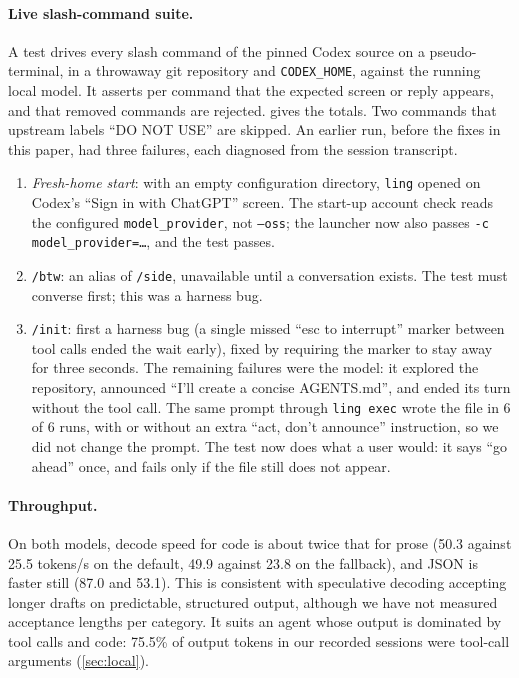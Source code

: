 \documentclass[11pt]{article}
\newcommand{\code}[1]{\texttt{#1}}
\begin{document}
\paragraph{Live slash-command suite.} A test drives every slash command of the pinned Codex source
on a pseudo-terminal, in a throwaway git repository and \code{CODEX\_HOME}, against the running
local model. It asserts per command that the expected screen or reply appears, and that removed
commands are rejected.  gives the totals. Two commands that upstream labels ``DO NOT
USE'' are skipped. An earlier run, before the fixes in this paper, had three failures, each
diagnosed from the session transcript.
\begin{enumerate}
  \item \emph{Fresh-home start}: with an empty configuration directory, \code{ling} opened on
    Codex's ``Sign in with ChatGPT'' screen. The start-up account check reads the configured
    \code{model\_provider}, not \code{--oss}; the launcher now also passes
    \code{-c model\_provider=\ldots}, and the test passes.
  \item \code{/btw}: an alias of \code{/side}, unavailable until a conversation exists. The test
    must converse first; this was a harness bug.
  \item \code{/init}: first a harness bug (a single missed ``esc to interrupt'' marker between tool
    calls ended the wait early), fixed by requiring the marker to stay away for three seconds. The
    remaining failures were the model: it explored the repository, announced ``I'll create a
    concise AGENTS.md'', and ended its turn without the tool call. The same prompt through
    \code{ling exec} wrote the file in 6 of 6 runs, with or without an extra
    ``act, don't announce'' instruction, so we did not change the prompt. The test now does what a
    user would: it says ``go ahead'' once, and fails only if the file still does not appear.
\end{enumerate}

\paragraph{Throughput.} On both models, decode speed for code is about twice that for prose (50.3
against 25.5 tokens/s on the default, 49.9 against 23.8 on the fallback), and JSON is faster still
(87.0 and 53.1). This is consistent with speculative decoding accepting longer drafts on
predictable, structured output, although we have not measured acceptance lengths per category. It
suits an agent whose output is dominated by tool calls and code: 75.5\% of output tokens in our
recorded sessions were tool-call arguments (\cref{sec:local}).
\end{document}
